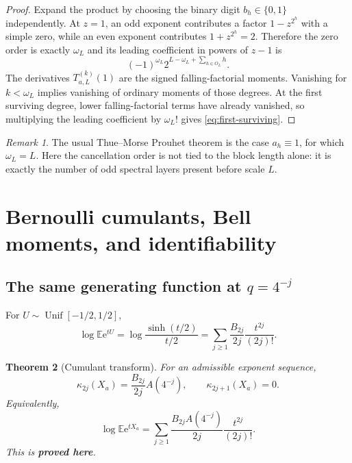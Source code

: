 \documentclass[11pt,oneside]{article}
\numberwithin{equation}{section}
\newtheorem{theorem}{Theorem}[section]
\theoremstyle{definition}
\theoremstyle{remark}
\newtheorem{remark}[theorem]{Remark}
\newcommand{\E}{\mathbb E}
\newcommand{\e}{\mathrm e}
\newcommand{\statusproved}{\textcolor{deepgreen}{\textbf{proved here}}}
\begin{document}
\begin{proof}
Expand the product by choosing the binary digit $b_h\in\{0,1\}$ independently.  At $z=1$,
an odd exponent contributes a factor $1-z^{2^h}$ with a simple zero, while an even exponent
contributes $1+z^{2^h}=2$.  Therefore the zero order is exactly $\omega_L$ and its leading
coefficient in powers of $z-1$ is
\[
 (-1)^{\omega_L}2^{L-\omega_L+\sum_{h\in O_L}h}.
\]
The derivatives $T_{a,L}^{(k)}(1)$ are the signed falling-factorial moments.  Vanishing for
$k<\omega_L$ implies vanishing of ordinary moments of those degrees.  At the first surviving
degree, lower falling-factorial terms have already vanished, so multiplying the leading
coefficient by $\omega_L!$ gives \eqref{eq:first-surviving}.
\end{proof}

\begin{remark}
The usual Thue--Morse Prouhet theorem is the case $a_h\equiv1$, for which
$\omega_L=L$.  Here the cancellation order is not tied to the block length alone: it is
exactly the number of odd spectral layers present before scale $L$.
\end{remark}

\section{Bernoulli cumulants, Bell moments, and identifiability}
\label{sec:cumulants}

\subsection{The same generating function at $q=4^{-j}$}

For $U\sim\operatorname{Unif}[-1/2,1/2]$,
\begin{equation}
 \log\E\e^{tU}
 =\log\frac{\sinh(t/2)}{t/2}
 =\sum_{j\ge1}\frac{B_{2j}}{2j}\frac{t^{2j}}{(2j)!}.
 \label{eq:uniform-cumulants}
\end{equation}

\begin{theorem}[Cumulant transform]
\label{thm:cumulants}
For an admissible exponent sequence,
\begin{equation}
 \boxed{\quad
 \kappa_{2j}(X_a)=\frac{B_{2j}}{2j}A(4^{-j}),
 \qquad
 \kappa_{2j+1}(X_a)=0.
 \quad}
 \label{eq:kappa-a}
\end{equation}
Equivalently,
\begin{equation}
 \log\E\e^{tX_a}
 =\sum_{j\ge1}\frac{B_{2j}A(4^{-j})}{2j}\frac{t^{2j}}{(2j)!}.
 \label{eq:mgf-a}
\end{equation}
This is \statusproved.
\end{theorem}
\end{document}
